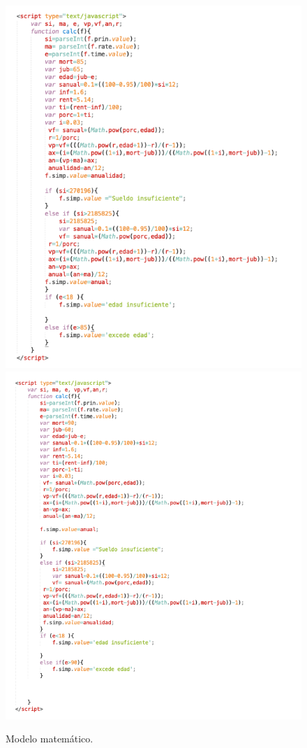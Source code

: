 \documentclass{udpreport}
\begin{document}
\begin{figure}[H]
    \centering
    \includegraphics [scale=0.2]{images/afphombre.png}
    \includegraphics[scale=0.2]{images/afpmujer.png}
    \caption{Modelo matemático.}
    
\end{figure}
\end{document}

